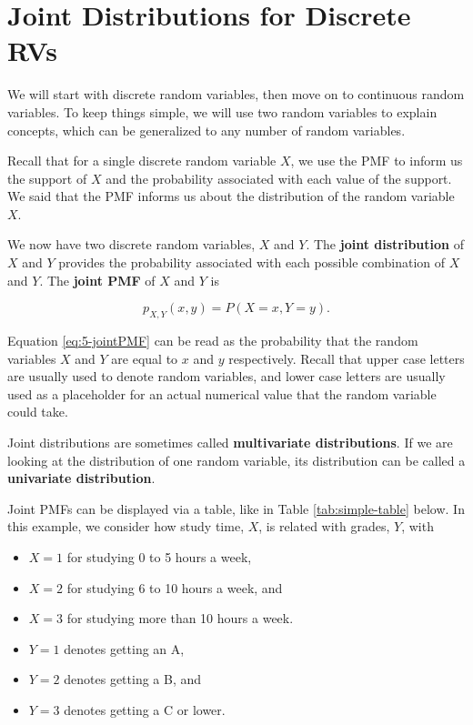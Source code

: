 \documentclass[
]{book}
\providecommand{\tightlist}{%
  \setlength{\itemsep}{0pt}\setlength{\parskip}{0pt}}
\begin{document}
\section{Joint Distributions for Discrete RVs}\label{joint-distributions-for-discrete-rvs}

We will start with discrete random variables, then move on to continuous random variables. To keep things simple, we will use two random variables to explain concepts, which can be generalized to any number of random variables.

Recall that for a single discrete random variable \(X\), we use the PMF to inform us the support of \(X\) and the probability associated with each value of the support. We said that the PMF informs us about the distribution of the random variable \(X\).

We now have two discrete random variables, \(X\) and \(Y\). The \textbf{joint distribution} of \(X\) and \(Y\) provides the probability associated with each possible combination of \(X\) and \(Y\). The \textbf{joint PMF} of \(X\) and \(Y\) is

\begin{equation} 
p_{X,Y}(x,y) = P(X=x, Y=y).
\label{eq:5-jointPMF}
\end{equation}

Equation \eqref{eq:5-jointPMF} can be read as the probability that the random variables \(X\) and \(Y\) are equal to \(x\) and \(y\) respectively. Recall that upper case letters are usually used to denote random variables, and lower case letters are usually used as a placeholder for an actual numerical value that the random variable could take.

Joint distributions are sometimes called \textbf{multivariate distributions}. If we are looking at the distribution of one random variable, its distribution can be called a \textbf{univariate distribution}.

Joint PMFs can be displayed via a table, like in Table \ref{tab:simple-table} below. In this example, we consider how study time, \(X\), is related with grades, \(Y\), with

\begin{itemize}
\tightlist
\item
  \(X=1\) for studying 0 to 5 hours a week,
\item
  \(X=2\) for studying 6 to 10 hours a week, and
\item
  \(X=3\) for studying more than 10 hours a week.
\item
  \(Y=1\) denotes getting an A,
\item
  \(Y=2\) denotes getting a B, and
\item
  \(Y=3\) denotes getting a C or lower.
\end{itemize}
\end{document}
